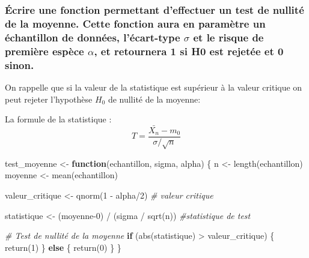\documentclass[
]{article}
\newenvironment{Shaded}{\begin{snugshade}}{\end{snugshade}}
\newcommand{\CommentTok}[1]{\textcolor[rgb]{0.56,0.35,0.01}{\textit{#1}}}
\newcommand{\ControlFlowTok}[1]{\textcolor[rgb]{0.13,0.29,0.53}{\textbf{#1}}}
\newcommand{\DecValTok}[1]{\textcolor[rgb]{0.00,0.00,0.81}{#1}}
\newcommand{\FunctionTok}[1]{\textcolor[rgb]{0.00,0.00,0.00}{#1}}
\newcommand{\NormalTok}[1]{#1}
\newcommand{\OtherTok}[1]{\textcolor[rgb]{0.56,0.35,0.01}{#1}}
\newcommand{\SpecialCharTok}[1]{\textcolor[rgb]{0.00,0.00,0.00}{#1}}
\begin{document}
\hypertarget{uxe9crire-une-fonction-permettant-deffectuer-un-test-de-nullituxe9-de-la-moyenne.-cette-fonction-aura-en-paramuxe8tre-un-uxe9chantillon-de-donnuxe9es-luxe9cart-type-sigma-et-le-risque-de-premiuxe8re-espuxe8ce-alpha-et-retournera-1-si-h0-est-rejetuxe9e-et-0-sinon.}{%
\subsubsection{\texorpdfstring{Écrire une fonction permettant
d'effectuer un test de nullité de la moyenne. Cette fonction aura en
paramètre un échantillon de données, l'écart-type \(\sigma\) et le
risque de première espèce \(\alpha\), et retournera 1 si H0 est rejetée
et 0
sinon.}{Écrire une fonction permettant d'effectuer un test de nullité de la moyenne. Cette fonction aura en paramètre un échantillon de données, l'écart-type \textbackslash sigma et le risque de première espèce \textbackslash alpha, et retournera 1 si H0 est rejetée et 0 sinon.}}\label{uxe9crire-une-fonction-permettant-deffectuer-un-test-de-nullituxe9-de-la-moyenne.-cette-fonction-aura-en-paramuxe8tre-un-uxe9chantillon-de-donnuxe9es-luxe9cart-type-sigma-et-le-risque-de-premiuxe8re-espuxe8ce-alpha-et-retournera-1-si-h0-est-rejetuxe9e-et-0-sinon.}}

On rappelle que si la valeur de la statistique est supérieur à la valeur
critique on peut rejeter l'hypothèse \(H_0\) de nullité de la moyenne:

La formule de la statistique :
\[ T=\frac{\bar{X_n}-m_0}{\sigma/\sqrt{n}} \]

\begin{Shaded}
\begin{Highlighting}[]
\NormalTok{test\_moyenne }\OtherTok{\textless{}{-}} \ControlFlowTok{function}\NormalTok{(echantillon, sigma, alpha) \{}
\NormalTok{  n }\OtherTok{\textless{}{-}} \FunctionTok{length}\NormalTok{(echantillon)}
\NormalTok{  moyenne }\OtherTok{\textless{}{-}} \FunctionTok{mean}\NormalTok{(echantillon) }
  
\NormalTok{  valeur\_critique }\OtherTok{\textless{}{-}} \FunctionTok{qnorm}\NormalTok{(}\DecValTok{1} \SpecialCharTok{{-}}\NormalTok{ alpha}\SpecialCharTok{/}\DecValTok{2}\NormalTok{)  }\CommentTok{\# valeur critique}
  
 
\NormalTok{  statistique }\OtherTok{\textless{}{-}}\NormalTok{ (moyenne}\DecValTok{{-}0}\NormalTok{) }\SpecialCharTok{/}\NormalTok{ (sigma }\SpecialCharTok{/} \FunctionTok{sqrt}\NormalTok{(n)) }\CommentTok{\#statistique de test}
  
  \CommentTok{\# Test de nullité de la moyenne}
  \ControlFlowTok{if}\NormalTok{ (}\FunctionTok{abs}\NormalTok{(statistique) }\SpecialCharTok{\textgreater{}}\NormalTok{ valeur\_critique) \{}
    \FunctionTok{return}\NormalTok{(}\DecValTok{1}\NormalTok{)  }
\NormalTok{  \} }\ControlFlowTok{else}\NormalTok{ \{}
    \FunctionTok{return}\NormalTok{(}\DecValTok{0}\NormalTok{)  }
\NormalTok{  \}}
\NormalTok{\}}
\end{Highlighting}
\end{Shaded}
\end{document}
